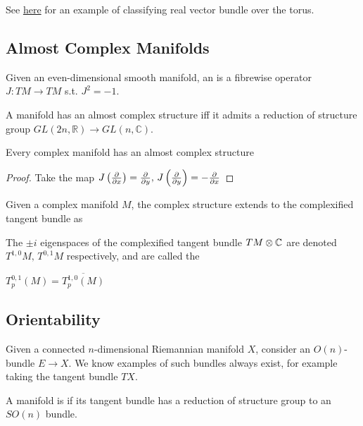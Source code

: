 \documentclass{article}
\begin{document}
\begin{example}
	See \href{https://math.stackexchange.com/questions/81981/is-there-a-way-to-establish-a-correspondence-between-the-vector-bundles-over-a-t}{here} for an example of classifying real vector bundle over the torus. 
\end{example}
\subsection{Almost Complex Manifolds}

\begin{definition}
	Given an even-dimensional smooth manifold, an  is a fibrewise operator $J:TM \to TM$ s.t. $J^2=-1$. 
\end{definition}

\begin{theorem}
	A manifold has an almost complex structure iff it admits a reduction of structure group $GL(2n, \mathbb{R}) \to GL(n, \mathbb{C})$. 
\end{theorem}

\begin{prop}
	Every complex manifold has an almost complex structure
\end{prop}
\begin{proof}
	Take the map $J\left( \frac{\partial}{\partial x} \right) = \frac{\partial}{\partial y}, \, J\left( \frac{\partial}{\partial y} \right) = - \frac{\partial}{\partial x}$
\end{proof}

Given a complex manifold $M$, the complex structure extends to the complexified tangent bundle as 

\begin{definition}
	The $\pm i$ eigenspaces of the complexified tangent bundle $TM\otimes \mathbb{C}$ are denoted $T^{1,0}M, \, T^{0,1}M$ respectively, and are called the 
\end{definition}

\begin{lemma}
	$T^{0,1}_p(M) = \overline{T^{1,0}_p(M)}$
\end{lemma}

\subsection{Orientability}\label{subsec:orientability via steifel whitney}
Given a connected $n$-dimensional Riemannian manifold $X$, consider an $O(n)$-bundle $E \to X$. We know examples of such bundles always exist, for example taking the tangent bundle $TX$. 
\begin{definition}
	A manifold is  if its tangent bundle has a reduction of structure group to an $SO(n)$ bundle. 
\end{definition}
\end{document}
